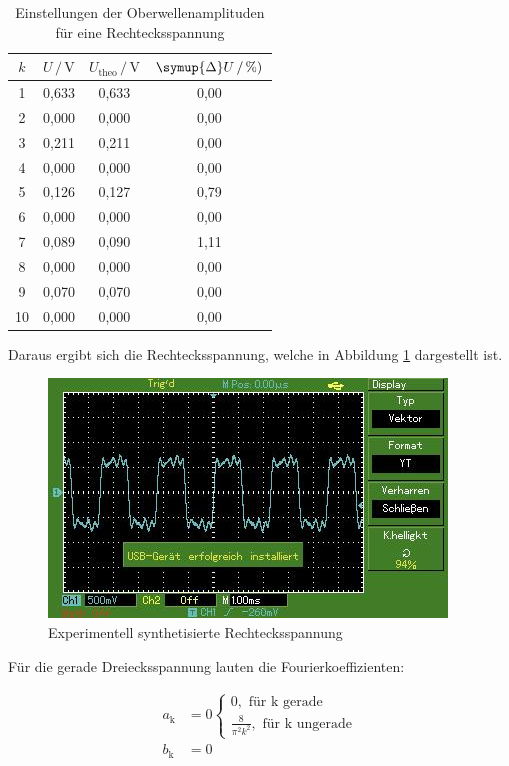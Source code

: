 \begin{table}[H]
    \centering
    \caption{Einstellungen der Oberwellenamplituden für eine Rechtecksspannung}
    \label{tab:Messdaten5}
    \begin{tabular}{c c c c}
    \toprule
    $k$ & $U \,/\, \si{\volt}$ & $U_\text{theo} \,/\, \si{\volt}$ & $\symup{\Delta}U \,/\, \si{\percent})$ \\
    \midrule
     1 & 0,633 & 0,633 & 0,00 \\
     2 & 0,000 & 0,000 & 0,00 \\
     3 & 0,211 & 0,211 & 0,00 \\
     4 & 0,000 & 0,000 & 0,00 \\
     5 & 0,126 & 0,127 & 0,79 \\
     6 & 0,000 & 0,000 & 0,00 \\
     7 & 0,089 & 0,090 & 1,11 \\
     8 & 0,000 & 0,000 & 0,00 \\
     9 & 0,070 & 0,070 & 0,00 \\
    10 & 0,000 & 0,000 & 0,00 \\
    \bottomrule
    \end{tabular}
\end{table}

Daraus ergibt sich die Rechtecksspannung, welche in Abbildung \ref{fig:Ex2}
dargestellt ist.

\begin{figure}[H]
    \centering
    \includegraphics[scale=0.7]{content/recht.jpg}
    \caption{Experimentell synthetisierte Rechtecksspannung}
    \label{fig:Ex2}
\end{figure}


Für die gerade Dreiecksspannung lauten die Fourierkoeffizienten:

\begin{align*}
    a_\text{k} &= 0 
        \begin{cases} 
            0, \text{ für k gerade} \\ \frac{8}{\pi^2 k^2}, \text{ für k ungerade}
        \end{cases} \\
    b_\text{k} &= 0
\end{align*}

